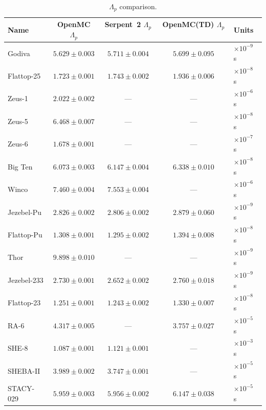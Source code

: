 \documentclass[12pt,preprint]{elsarticle}
\begin{document}
\begin{table}[H]
\centering
\caption{$\Lambda_p$ comparison.}
\label{tab:lit_lambda}
\footnotesize
\begin{tabular}{@{}lcccl@{}}
\toprule
Name & OpenMC $\Lambda_p$ & Serpent~2 $\Lambda_p$~\cite{leppanen2014} & OpenMC(TD) $\Lambda_p$~\cite{romero2022} & Units \\
\midrule
Godiva       & $5.629 \pm 0.003$ & $5.711 \pm 0.004$      & $5.699 \pm 0.095$      & $\times 10^{-9}$ s \\
Flattop-25   & $1.723 \pm 0.001$ & $1.743 \pm 0.002$      & $1.936 \pm 0.006$      & $\times 10^{-8}$ s \\
Zeus-1       & $2.022 \pm 0.002$ & ---                    & ---                    & $\times 10^{-6}$ s \\
Zeus-5       & $6.468 \pm 0.007$ & ---                    & ---                    & $\times 10^{-8}$ s \\
Zeus-6       & $1.678 \pm 0.001$ & ---                    & ---                    & $\times 10^{-7}$ s \\
Big Ten      & $6.073 \pm 0.003$ & $6.147 \pm 0.004$      & $6.338 \pm 0.010$      & $\times 10^{-8}$ s \\
Winco        & $7.460 \pm 0.004$ & $7.553 \pm 0.004$      & ---                    & $\times 10^{-6}$ s \\
Jezebel-Pu   & $2.826 \pm 0.002$ & $2.806 \pm 0.002$      & $2.879 \pm 0.060$      & $\times 10^{-9}$ s \\
Flattop-Pu   & $1.308 \pm 0.001$ & $1.295 \pm 0.002$      & $1.394 \pm 0.008$      & $\times 10^{-8}$ s \\
Thor         & $9.898 \pm 0.010$ & ---                    & ---                    & $\times 10^{-9}$ s \\
Jezebel-233  & $2.730 \pm 0.001$ & $2.652 \pm 0.002$      & $2.760 \pm 0.018$      & $\times 10^{-9}$ s \\
Flattop-23   & $1.251 \pm 0.001$ & $1.243 \pm 0.002$      & $1.330 \pm 0.007$      & $\times 10^{-8}$ s \\
RA-6         & $4.317 \pm 0.005$ & ---                    & $3.757 \pm 0.027$      & $\times 10^{-5}$ s \\
SHE-8        & $1.087 \pm 0.001$ & $1.121 \pm 0.001$      & ---                    & $\times 10^{-3}$ s \\
SHEBA-II     & $3.989 \pm 0.002$ & $3.747 \pm 0.001$      & ---                    & $\times 10^{-5}$ s \\
STACY-029    & $5.959 \pm 0.003$ & $5.956 \pm 0.002$      & $6.147 \pm 0.038$      & $\times 10^{-5}$ s \\

\end{tabular}
\end{table}
\end{document}
